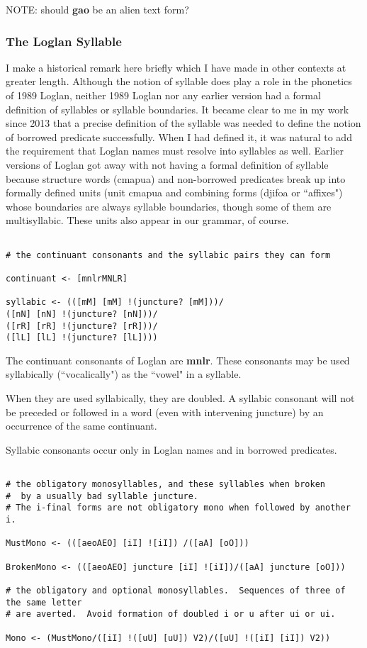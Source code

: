 \documentclass{article}
\begin{document}
NOTE:  should {\bf gao} be an alien text form?

\subsubsection{The Loglan Syllable}

I make a historical remark here briefly which I have made in other contexts at greater length.  Although the notion of syllable does play a role in the phonetics of 1989 Loglan, neither 1989 Loglan nor any earlier version had a formal definition of syllables or syllable boundaries.  It became clear to me in my work since 2013 that a precise definition of the syllable was needed to define the notion of borrowed predicate successfully.  When I had defined it, it was natural to add the requirement that Loglan names must resolve into syllables as well.  Earlier versions of Loglan got away with not having a formal definition of syllable because structure words (cmapua) and non-borrowed predicates break up into formally defined units (unit cmapua and combining forms (djifoa or ``affixes") whose boundaries are always syllable boundaries, though some of them are multisyllabic.  These units also appear in our grammar, of course.

\begin{verbatim}

# the continuant consonants and the syllabic pairs they can form

continuant <- [mnlrMNLR]

syllabic <- (([mM] [mM] !(juncture? [mM]))/
([nN] [nN] !(juncture? [nN]))/
([rR] [rR] !(juncture? [rR]))/
([lL] [lL] !(juncture? [lL])))

\end{verbatim}

The continuant consonants of Loglan are {\bf mnlr}.  These consonants may be used syllabically (``vocalically") as the ``vowel" in a syllable.

When they are used syllabically, they are doubled.  A syllabic consonant will not be preceded or followed in a word (even with intervening juncture) by an occurrence of the same continuant.

Syllabic consonants occur only in Loglan names and in borrowed predicates.

\begin{verbatim}

# the obligatory monosyllables, and these syllables when broken
#  by a usually bad syllable juncture.
# The i-final forms are not obligatory mono when followed by another i.

MustMono <- (([aeoAEO] [iI] ![iI]) /([aA] [oO]))

BrokenMono <- (([aeoAEO] juncture [iI] ![iI])/([aA] juncture [oO]))

# the obligatory and optional monosyllables.  Sequences of three of the same letter
# are averted.  Avoid formation of doubled i or u after ui or ui.

Mono <- (MustMono/([iI] !([uU] [uU]) V2)/([uU] !([iI] [iI]) V2))

\end{verbatim}
\end{document}
